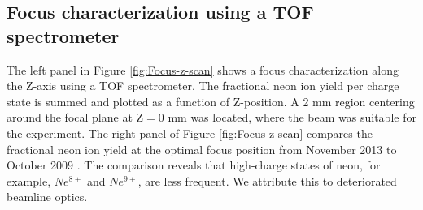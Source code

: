\subsection{Focus characterization using a TOF spectrometer}
%
The left panel in Figure \ref{fig:Focus-z-scan} shows a focus characterization along the Z-axis using a TOF spectrometer. The fractional neon ion yield per charge state is summed and plotted as a function of Z-position. A 2 mm region centering around the focal plane at $\text{Z}=0$ mm was located, where the beam was suitable for the experiment. The right panel of Figure \ref{fig:Focus-z-scan} compares the fractional neon ion yield at the optimal focus position from November 2013 \citep{Bucher-2016-Unpublished} to October 2009 \citep{Doumy-2011-PRL}. The comparison reveals that high-charge states of neon, for example, $Ne^{8+}$ and $Ne^{9+}$, are less frequent. We attribute this to deteriorated beamline optics.\\
